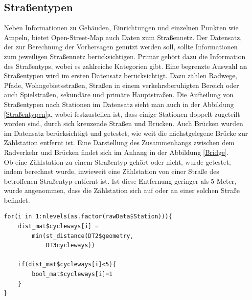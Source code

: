 \documentclass[a4paper,12pt]{thesis}
\begin{document}
\subsection{Straßentypen}

Neben Informationen zu Gebäuden, Einrichtungen und einzelnen Punkten wie Ampeln, bietet Open-Street-Map auch Daten zum Straßennetz. Der Datensatz, der zur Berechnung der Vorhersagen genutzt werden soll, sollte Informationen zum jeweiligen Straßennetz berücksichtigen. Primär gehört dazu die Information des Straßentyps, wobei es zahlreiche Kategorien gibt. Eine begrenzte Auswahl an Straßentypen wird im ersten Datensatz berücksichtigt. Dazu zählen Radwege, Pfade, Wohngebietsstraßen, Straßen in einem verkehrsberuhigten Bereich oder auch Spielstraßen, sekundäre und primäre Hauptstraßen. Die Aufteilung von Straßentypen nach Stationen im Datensatz sieht man auch in der Abbildung \ref{Straßentypen}a, wobei festzustellen ist, dass einige Stationen doppelt zugeteilt worden sind, durch sich kreuzende Straßen und Brücken. Auch Brücken wurden im Datensatz berücksichtigt und getestet, wie weit die nächstgelegene Brücke zur Zählstation entfernt ist. Eine Darstellung des Zusammenhangs zwischen dem Radverkehr und Brücken findet sich im Anhang in der Abbildung \ref{Bridge}.\\

Ob eine Zählstation zu einem Straßentyp gehört oder nicht, wurde getestet, indem berechnet wurde, inwieweit eine Zählstation von einer Straße des betroffenen Straßentyp entfernt ist. Ist diese Entfernung geringer als 5 Meter, wurde angenommen, dass die Zählstation sich auf oder an einer solchen Straße befindet. 

\begin{minipage}{\linewidth}
\begin{lstlisting}[caption={Teste den Straßentyp},label=code:streettype_a]
for(i in 1:nlevels(as.factor(rawData$Station))){
	dist_mat$cycleways[i] =
		min(st_distance(DT2$geometry, 
			DT3cycleways))
			
	if(dist_mat$cycleways[i]<5){
		bool_mat$cycleways[i]=1
	}
}
\end{lstlisting}
\end{minipage}
\end{document}
